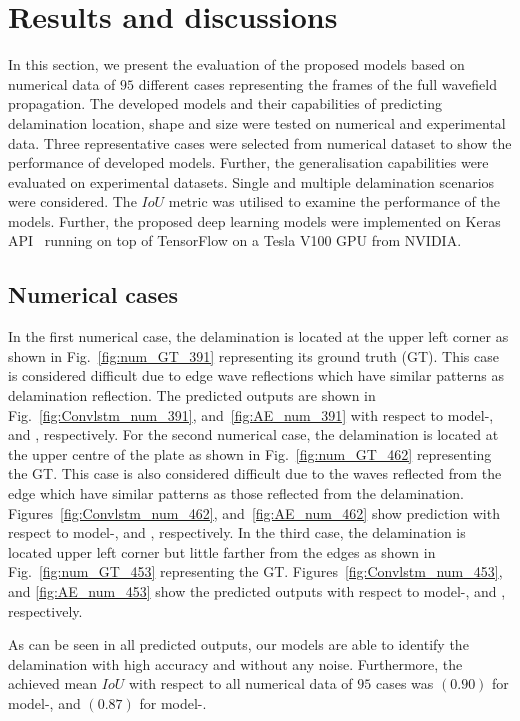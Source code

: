\section{Results and discussions}
In this section,  we present the evaluation of the proposed models based on numerical data of \(95\) different cases representing the frames of the full wavefield propagation. 
The developed models and their capabilities of predicting delamination location, shape and size were tested on numerical and experimental data.  
Three representative cases were selected from numerical dataset to show the performance of developed models. 
Further, the generalisation capabilities were evaluated on experimental datasets.  
Single and multiple delamination scenarios were considered.
The \(IoU\) metric was utilised to examine the performance of the models.
Further, the proposed deep learning models were implemented
on Keras API~\cite{chollet2015keras} running on top of TensorFlow on a Tesla V100 GPU  from NVIDIA. 
\subsection{Numerical cases}
In the first numerical case, the delamination is located at the upper left corner as shown in Fig.~\ref{fig:num_GT_391} representing its ground truth (GT).
This case is considered difficult due to edge wave reflections which have similar patterns as delamination reflection.
The predicted outputs are shown in Fig.~\ref{fig:Convlstm_num_391}, and~\ref{fig:AE_num_391} with respect to model-, and , respectively.
For the second numerical case, the delamination is located at the upper centre of the plate as shown in Fig.~\ref{fig:num_GT_462} representing the GT.
This case is also considered difficult due to the waves reflected from the edge which have similar patterns as those reflected from the delamination.
Figures~\ref{fig:Convlstm_num_462}, and~\ref{fig:AE_num_462} show prediction with respect to model-, and , respectively.
In the third case, the delamination is located upper left corner but little farther from the edges as shown in Fig.~\ref{fig:num_GT_453} representing the GT. 
Figures~\ref{fig:Convlstm_num_453}, and \ref{fig:AE_num_453} show the predicted outputs with respect to model-, and , respectively.

As can be seen in all predicted outputs, our models are able to identify the delamination with high accuracy and without any noise.
Furthermore, the achieved mean \(IoU\) with respect to all numerical data of \(95\) cases was \((0.90)\) for model-, and \((0.87)\) for model-. 

